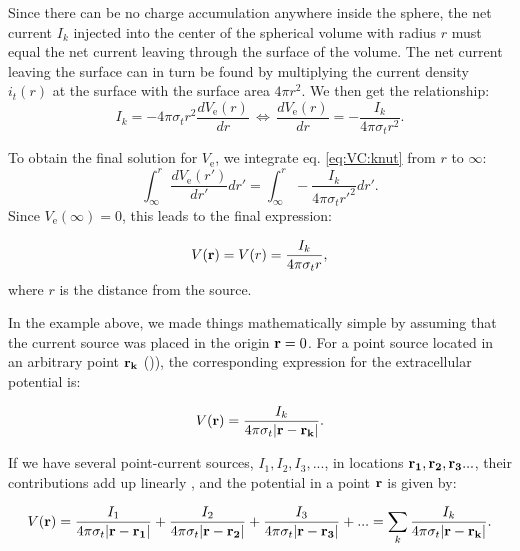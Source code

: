 Since there can be no charge accumulation anywhere inside the sphere, the net current $I_k$ injected into the center of the spherical volume with radius $r$ must equal the net current leaving through the surface of the volume. The net current leaving the surface can in turn be found by multiplying the current density $i_t(r)$ at the surface with the surface area $4\pi r^2$. We then get the relationship:
\begin{equation}
I_k = -4\pi \sigma_t r^2  \frac{dV_\mathrm{e}(r)}{dr} \, \iff \, \frac{dV_\mathrm{e}(r)}{dr} = -\frac{I_k}{4\pi \sigma_t r^2 }.
\label{eq:VC:knut}
\end{equation}

To obtain the final solution for $V_\mathrm{e}$, we integrate eq. \ref{eq:VC:knut} from $r$ to $\infty$:
\begin{equation}
\int_{\infty}^r \frac{dV_\mathrm{e}(r')}{dr'} dr' = \int_{\infty}^r -\frac{I_k}{4\pi \sigma_t r'^2 } dr'.
\label{eq:VC:knut2}
\end{equation}
Since $V_\mathrm{e}({\infty}) = 0$, this leads to the final expression:

\begin{equation}
V({\bf r}) = V(r) = \frac{I_k}{4\pi \sigma_t r},
\label{eq:VC:pointsource}
\end{equation}
where $r$ is the distance from the source.

In the example above, we made things mathematically simple by assuming that the current source was placed in the origin ${\bf r} = 0$. For a point source located in an arbitrary point ${\bf r_k} $ ()), the corresponding expression for the extracellular potential is:

\begin{equation}
V({\bf r}) = \frac{I_k}{4\pi \sigma_t |{\bf r-r_k}|}.
\label{eq:VC:pointsource2}
\end{equation}

If we have several point-current sources, $I_{1}, I_2, I_3, ... $, in locations ${\bf r_1}, {\bf r_2}, {\bf r_3} ... $, their contributions add up linearly , and the potential in a point ${\bf r}$ is given by:

\begin{equation}
V({\bf r}) = \frac{I_1}{4\pi  \sigma_t {\bf |r-r_1|}} + \frac{I_2}{4\pi  \sigma_t {\bf |r-r_2|} } + \frac{I_3}{4\pi  \sigma_t {\bf |r-r_3|} } + ... = \sum_k \frac{I_k}{4\pi  \sigma_t {\bf |r-r_k|} }.
\label{eq:VC:pointsources}
\end{equation}

